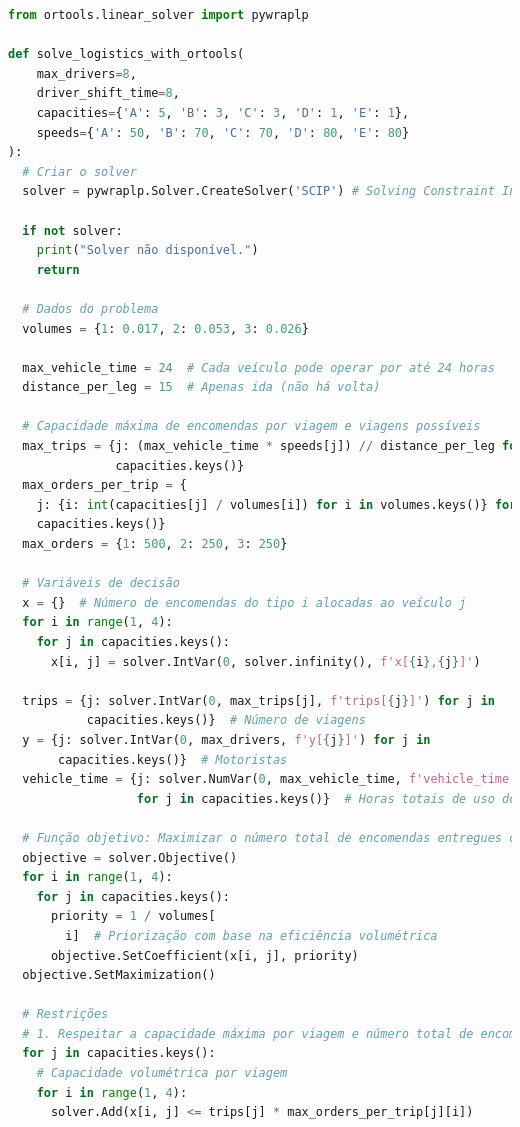 \documentclass[12pt,a4paper,final]{article}
\begin{document}
    \begin{lstlisting}[language=Python, label={lst:codigo}]
from ortools.linear_solver import pywraplp

def solve_logistics_with_ortools(
    max_drivers=8,
    driver_shift_time=8,
    capacities={'A': 5, 'B': 3, 'C': 3, 'D': 1, 'E': 1},
    speeds={'A': 50, 'B': 70, 'C': 70, 'D': 80, 'E': 80}
):
  # Criar o solver
  solver = pywraplp.Solver.CreateSolver('SCIP') # Solving Constraint Integer Programs

  if not solver:
    print("Solver não disponível.")
    return

  # Dados do problema
  volumes = {1: 0.017, 2: 0.053, 3: 0.026}

  max_vehicle_time = 24  # Cada veículo pode operar por até 24 horas
  distance_per_leg = 15  # Apenas ida (não há volta)

  # Capacidade máxima de encomendas por viagem e viagens possíveis
  max_trips = {j: (max_vehicle_time * speeds[j]) // distance_per_leg for j in
               capacities.keys()}
  max_orders_per_trip = {
    j: {i: int(capacities[j] / volumes[i]) for i in volumes.keys()} for j in
    capacities.keys()}
  max_orders = {1: 500, 2: 250, 3: 250}

  # Variáveis de decisão
  x = {}  # Número de encomendas do tipo i alocadas ao veículo j
  for i in range(1, 4):
    for j in capacities.keys():
      x[i, j] = solver.IntVar(0, solver.infinity(), f'x[{i},{j}]')

  trips = {j: solver.IntVar(0, max_trips[j], f'trips[{j}]') for j in
           capacities.keys()}  # Número de viagens
  y = {j: solver.IntVar(0, max_drivers, f'y[{j}]') for j in
       capacities.keys()}  # Motoristas
  vehicle_time = {j: solver.NumVar(0, max_vehicle_time, f'vehicle_time[{j}]')
                  for j in capacities.keys()}  # Horas totais de uso do veículo

  # Função objetivo: Maximizar o número total de encomendas entregues com prioridade para encomendas menores
  objective = solver.Objective()
  for i in range(1, 4):
    for j in capacities.keys():
      priority = 1 / volumes[
        i]  # Priorização com base na eficiência volumétrica
      objective.SetCoefficient(x[i, j], priority)
  objective.SetMaximization()

  # Restrições
  # 1. Respeitar a capacidade máxima por viagem e número total de encomendas entregues
  for j in capacities.keys():
    # Capacidade volumétrica por viagem
    for i in range(1, 4):
      solver.Add(x[i, j] <= trips[j] * max_orders_per_trip[j][i])


\end{lstlisting}
\end{document}
